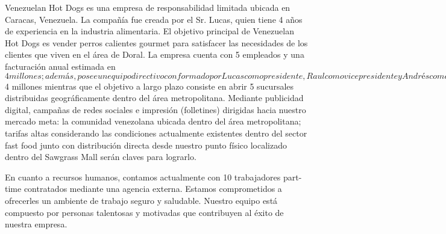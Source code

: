 
                Venezuelan Hot Dogs es una empresa de responsabilidad limitada ubicada en Caracas, Venezuela. La compañía fue creada por el Sr. Lucas, quien tiene 4 años de experiencia en la industria alimentaria. El objetivo principal de Venezuelan Hot Dogs es vender perros calientes gourmet para satisfacer las necesidades de los clientes que viven en el área de Doral. La empresa cuenta con 5 empleados y una facturación anual estimada en $4 millones; además, posee un equipo directivo conformado por Lucas como presidente, Raul como vicepresidente y Andrés como gerente de operaciones.

                La industria alimenticia está experimentando muchos cambios debido a la tendencia hacia los alimentos saludables y rápidos. Esto ha generado una gran cantidad de competencia entre restaurantes locales, cadenas grandes y nuevos ingresantes al mercado diariamente. El poder negociador está a favor del proveedor, ya que solo hay un suministro para el pan; mientras que no hay poder negociador para los compradores. Las principales fuentes de presión competitiva son los precios bajos, la diferenciación del producto, el marketing y otros aspectos relacionados con el mix de marketing.

                Venezuelan Hot Dogs ofrece dos tipos principales de perros calientes: Perro Caliente 1 y Perro Caliente 2; ambas opciones cumplen con las necesidades del cliente ya sea por su sabor único o por su conveniencia. Los ingredientes usados para preparar nuestros productos son exclusivamente frescos, lo que nos permite ofrecer platos adaptados a la cultura venezolana con excelente embalaje para mantener sus propiedades organolépticas intactas hasta llegar al consumidor final sin perder su sabor original ni textura deseada. Nuestras ventajas competitivas radican principalmente en nuestro sabor único, combinado con nuestra atención personalizada basada en servicios rápidamente entregados al consumidor final sin comprometer la calidad del producto servido.

                El objetivo a corto plazo es lograr ventas anualizadas por $4 millones mientras que el objetivo a largo plazo consiste en abrir 5 sucursales distribuidas geográficamente dentro del área metropolitana. Mediante publicidad digital, campañas de redes sociales e impresión (folletines) dirigidas hacia nuestro mercado meta: la comunidad venezolana ubicada dentro del área metropolitana; tarifas altas considerando las condiciones actualmente existentes dentro del sector fast food junto con distribución directa desde nuestro punto físico localizado dentro del Sawgrass Mall serán claves para lograrlo.

                En cuanto a recursos humanos, contamos actualmente con 10 trabajadores part-time contratados mediante una agencia externa. Estamos comprometidos a ofrecerles un ambiente de trabajo seguro y saludable. Nuestro equipo está compuesto por personas talentosas y motivadas que contribuyen al éxito de nuestra empresa.
